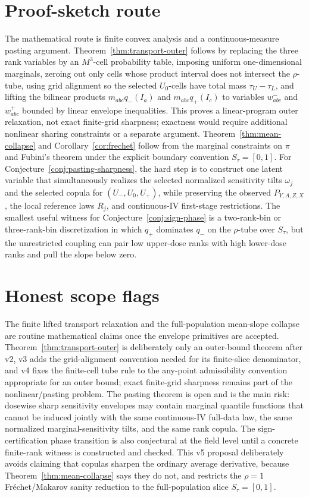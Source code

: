 \documentclass[11pt]{article}
\theoremstyle{definition}
\theoremstyle{plain}
\theoremstyle{remark}
\begin{document}
\section{Proof-sketch route}
The mathematical route is finite convex analysis and a continuous-measure pasting argument.  Theorem~\ref{thm:transport-outer} follows by replacing the three rank variables by an \(M^3\)-cell probability table, imposing uniform one-dimensional marginals, zeroing out only cells whose product interval does not intersect the \(\rho\)-tube, using grid alignment so the selected \(U_0\)-cells have total mass \(\tau_U-\tau_L\), and lifting the bilinear products \(m_{abc}q_-(I_a)\) and \(m_{abc}q_+(I_c)\) to variables \(w^-_{abc}\) and \(w^+_{abc}\) bounded by linear envelope inequalities.  This proves a linear-program outer relaxation, not exact finite-grid sharpness; exactness would require additional nonlinear sharing constraints or a separate argument.  Theorem~\ref{thm:mean-collapse} and Corollary~\ref{cor:frechet} follow from the marginal constraints on \(\pi\) and Fubini's theorem under the explicit boundary convention \(S_\tau=[0,1]\).  For Conjecture~\ref{conj:pasting-sharpness}, the hard step is to construct one latent variable that simultaneously realizes the selected normalized sensitivity tilts \(\omega_j\) and the selected copula for \((U_-,U_0,U_+)\), while preserving the observed \(P_{Y,A,Z,X}\), the local reference laws \(R_j\), and continuous-IV first-stage restrictions.  The smallest useful witness for Conjecture~\ref{conj:sign-phase} is a two-rank-bin or three-rank-bin discretization in which \(q_+\) dominates \(q_-\) on the \(\rho\)-tube over \(S_\tau\), but the unrestricted coupling can pair low upper-dose ranks with high lower-dose ranks and pull the slope below zero.

\section{Honest scope flags}
The finite lifted transport relaxation and the full-population mean-slope collapse are routine mathematical claims once the envelope primitives are accepted.  Theorem~\ref{thm:transport-outer} is deliberately only an outer-bound theorem after v2, v3 adds the grid-alignment convention needed for its finite-slice denominator, and v4 fixes the finite-cell tube rule to the any-point admissibility convention appropriate for an outer bound; exact finite-grid sharpness remains part of the nonlinear/pasting problem.  The pasting theorem is open and is the main risk: dosewise sharp sensitivity envelopes may contain marginal quantile functions that cannot be induced jointly with the same continuous-IV full-data law, the same normalized marginal-sensitivity tilts, and the same rank copula.  The sign-certification phase transition is also conjectural at the field level until a concrete finite-rank witness is constructed and checked.  This v5 proposal deliberately avoids claiming that copulas sharpen the ordinary average derivative, because Theorem~\ref{thm:mean-collapse} says they do not, and restricts the \(\rho=1\) Fréchet/Makarov sanity reduction to the full-population slice \(S_\tau=[0,1]\).
\end{document}
